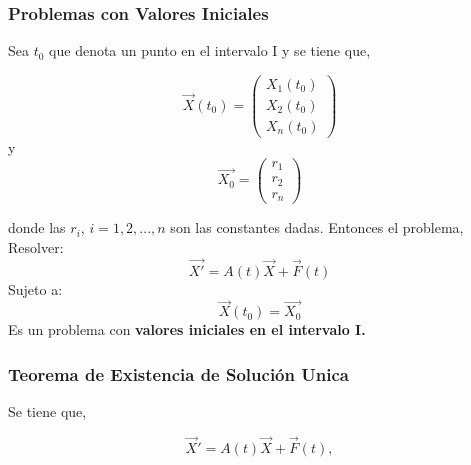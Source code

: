 \documentclass[titlepage]{article}
\begin{document}
        
        \subsubsection{Problemas con Valores Iniciales}
                
            Sea $t_0$ que denota un punto en el intervalo I y se tiene que, 
        
        \begin{equation*}
            \Vec{X}(t_0) =
            \begin{pmatrix}
                X_1(t_0) \\
                X_2(t_0) \\
                X_n (t_0)
            \end{pmatrix}
        \end{equation*}   
        y    
        \begin{equation*}
            \Vec{X_0} =
            \begin{pmatrix}
                r_1 \\
                r_2 \\
                r_n
            \end{pmatrix}
        \end{equation*}   
        
        donde las $r_i$, $i = 1,2,...,n$ son las constantes dadas. Entonces el problema,\vspace{0.3cm}
            Resolver:
            \begin{equation*}
                \Vec{X'} = A(t)\Vec{X} + \Vec{F}(t)
            \end{equation*}
            Sujeto a: 
            \begin{equation*}
                \Vec{X}(t_0) = \Vec{X_0}
            \end{equation*}
            Es un problema con \textbf{ valores iniciales en el intervalo I.}\cite{Zill2002a}
        \subsubsection{Teorema de Existencia de Solución Unica}\par\vspace{0.3cm}
            
            Se tiene que, \par\vspace{0.1cm}
                \begin{equation*}
                    \vec{X}' = A(t)\vec{X} + \vec{F}(t), 
                \end{equation*}
                
\end{document}
